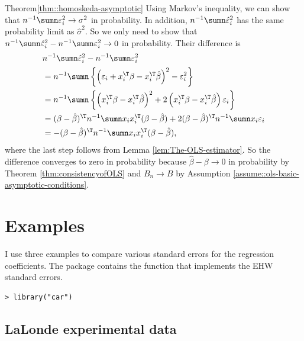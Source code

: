 \begin{myproof}{Theorem}{\ref{thm::homoskeda-asymptotic}}
Using Markov's inequality, we can show that $n^{-1}\sumn\varepsilon_{i}^{2}\rightarrow\sigma^{2}$ 
in probability. In addition, $n^{-1}\sumn\hat{\varepsilon}_{i}^{2}$ has the
same probability limit as $\hat{\sigma}^{2}$. So we only need to
show that $n^{-1}\sumn\hat{\varepsilon}_{i}^{2}-n^{-1}\sumn\varepsilon_{i}^{2}\rightarrow0$
in probability. Their difference is
\begin{align*}
&n^{-1}\sumn\hat{\varepsilon}_{i}^{2}-n^{-1}\sumn\varepsilon_{i}^{2} \\
& =n^{-1}\sumn\left\{ \left(\varepsilon_{i}+x_{i}^{\T}\beta-x_{i}^{\T}\hat{\beta}\right)^{2}-\varepsilon_{i}^{2}\right\} \\
 & =n^{-1}\sumn\left\{ \left(x_{i}^{\T}\beta-x_{i}^{\T}\hat{\beta}\right)^{2}+2\left(x_{i}^{\T}\beta-x_{i}^{\T}\hat{\beta}\right)\varepsilon_{i}\right\} \\
 & =(\beta-\hat{\beta})^{\T}n^{-1}\sumn x_{i}x_{i}^{\T}(\beta-\hat{\beta})+2(\beta-\hat{\beta})^{\T}n^{-1}\sumn x_{i}\varepsilon_{i} 
 \\
 &= -(\beta-\hat{\beta})^{\T}n^{-1}\sumn x_{i}x_{i}^{\T}(\beta-\hat{\beta}),
\end{align*}
where the last step follows from Lemma \ref{lem:The-OLS-estimator}. So the difference converges to zero in probability because $\hat{\beta}-\beta\rightarrow0$
in probability by Theorem \ref{thm:consistencyofOLS} and $B_{n}\rightarrow B$ by Assumption \ref{assume::ols-basic-asymptotic-conditions}. 
\end{myproof}
%





\section{Examples}


I use three examples to compare various standard errors for the regression coefficients. The  package contains the  function that implements the EHW standard errors.  

\begin{lstlisting}
> library("car")
\end{lstlisting}


\subsection{LaLonde experimental data}

